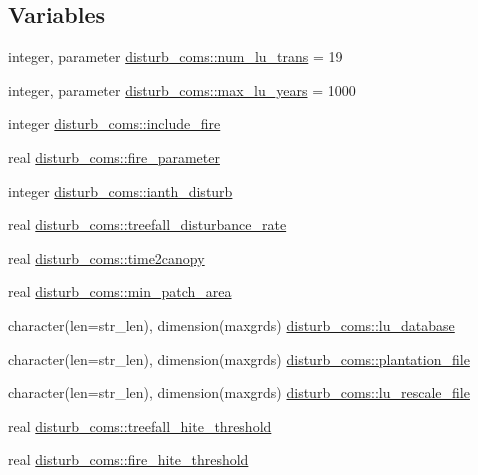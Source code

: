 \subsection*{Variables}
\begin{DoxyCompactItemize}
\item 
integer, parameter \hyperlink{namespacedisturb__coms_ac39535da2e75c569a86d8f91379d75d9}{disturb\+\_\+coms\+::num\+\_\+lu\+\_\+trans} = 19
\item 
integer, parameter \hyperlink{namespacedisturb__coms_af76000b5f155f76ed0e8fd62ef9873e5}{disturb\+\_\+coms\+::max\+\_\+lu\+\_\+years} = 1000
\item 
integer \hyperlink{namespacedisturb__coms_a06107f7321a3d53a2c6c5d5accffdb86}{disturb\+\_\+coms\+::include\+\_\+fire}
\item 
real \hyperlink{namespacedisturb__coms_a2c64507b16785f128382bbaedda43397}{disturb\+\_\+coms\+::fire\+\_\+parameter}
\item 
integer \hyperlink{namespacedisturb__coms_af07d8f3335cce355394feb232ad87468}{disturb\+\_\+coms\+::ianth\+\_\+disturb}
\item 
real \hyperlink{namespacedisturb__coms_ab4604255008b23efcdf5edc4d3fbdabe}{disturb\+\_\+coms\+::treefall\+\_\+disturbance\+\_\+rate}
\item 
real \hyperlink{namespacedisturb__coms_abbe69bdb8568232491820307dfa0e8a2}{disturb\+\_\+coms\+::time2canopy}
\item 
real \hyperlink{namespacedisturb__coms_aae4a074357ca036d5e9c30996499aef1}{disturb\+\_\+coms\+::min\+\_\+patch\+\_\+area}
\item 
character(len=str\+\_\+len), dimension(maxgrds) \hyperlink{namespacedisturb__coms_accab313ae8921e27e72f8b4b78f9fc2b}{disturb\+\_\+coms\+::lu\+\_\+database}
\item 
character(len=str\+\_\+len), dimension(maxgrds) \hyperlink{namespacedisturb__coms_ac1b7ac7c81566618705267bc595476bf}{disturb\+\_\+coms\+::plantation\+\_\+file}
\item 
character(len=str\+\_\+len), dimension(maxgrds) \hyperlink{namespacedisturb__coms_ae23e33ce9008eba7d28598e7609b1ecd}{disturb\+\_\+coms\+::lu\+\_\+rescale\+\_\+file}
\item 
real \hyperlink{namespacedisturb__coms_a5073d33199400f190150b8f2d364bf72}{disturb\+\_\+coms\+::treefall\+\_\+hite\+\_\+threshold}
\item 
real \hyperlink{namespacedisturb__coms_afc2f848dc7eaa0f53d0b71df027ded1c}{disturb\+\_\+coms\+::fire\+\_\+hite\+\_\+threshold}
\item 

\end{DoxyCompactItemize}
